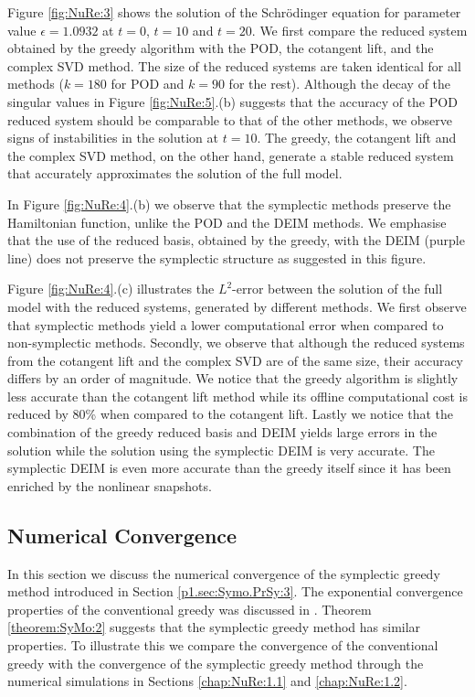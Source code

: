 Figure \ref{fig:NuRe:3} shows the solution of the Schr\"odinger equation for parameter value $\epsilon = 1.0932$ at $t=0$, $t=10$ and $t=20$. We first compare the reduced system obtained by the greedy algorithm with the POD, the cotangent lift, and the complex SVD method. The size of the reduced systems are taken identical for all methods ($k=180$ for POD and $k=90$ for the rest). Although the decay of the singular values in Figure \ref{fig:NuRe:5}.(b) suggests that the accuracy of the POD reduced system should be comparable to that of the other methods, we observe signs of instabilities in the solution at $t=10$. The greedy, the cotangent lift and the complex SVD method, on the other hand, generate a stable reduced system that accurately approximates the solution of the full model.

In Figure \ref{fig:NuRe:4}.(b) we observe that the symplectic methods preserve the Hamiltonian function, unlike the POD and the DEIM methods. We emphasise that the use of the reduced basis, obtained by the greedy, with the DEIM (purple line) does not preserve the symplectic structure as suggested in this figure.

Figure \ref{fig:NuRe:4}.(c) illustrates the $L^2$-error between the solution of the full model with the reduced systems, generated by different methods. We first observe that symplectic methods yield a lower computational error when compared to non-symplectic methods. Secondly, we observe that although the reduced systems from the cotangent lift and the complex SVD are of the same size, their accuracy differs by an order of magnitude. We notice that the greedy algorithm is slightly less accurate than the cotangent lift method while its offline computational cost is reduced by 80\% when compared to the cotangent lift. Lastly we notice that the combination of the greedy reduced basis and DEIM yields large errors in the solution while the solution using the symplectic DEIM is very accurate. The symplectic DEIM is even more accurate than the greedy itself since it has been enriched by the nonlinear snapshots. 

\subsection{Numerical Convergence} \label{p1.sec:numcom} In this section we discuss the numerical convergence of the symplectic greedy method introduced in Section \ref{p1.sec:Symo.PrSy:3}. The exponential convergence properties of the conventional greedy was discussed in . Theorem \ref{theorem:SyMo:2} suggests that the symplectic greedy method has similar properties. To illustrate this we compare the convergence of the conventional greedy with the convergence of the symplectic greedy method through the numerical simulations in Sections \ref{chap:NuRe:1.1} and \ref{chap:NuRe:1.2}. 

